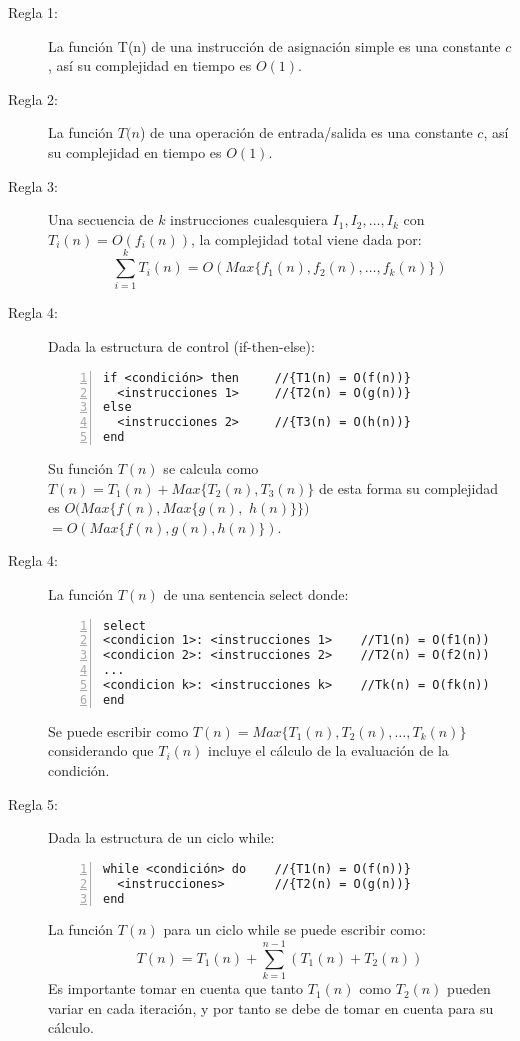 \begin{description}
\item[Regla 1:] La función T(n) de una instrucción de asignación simple es una constante $c$, así su complejidad en tiempo es $O(1)$.

\item[Regla 2:] La función $T(n$) de una operación de entrada/salida es una constante $c$, así su complejidad en tiempo es $O(1)$.

\item[Regla 3:] Una secuencia de $k$ instrucciones cualesquiera $I_1, I_2, \dots , I_k$ con $T_i(n) = O(f_i(n))$, la complejidad total viene dada por:
$$\sum_{i=1}^{k}{T_i(n)}=O(Max\{f_1(n), f_2(n), \dots, f_k(n)\})$$

\item[Regla 4:] Dada la estructura de control (if-then-else):
\begin{lstlisting}[upquote=true, language=pseudo, numbers=left]
if <condición> then		//{T1(n) = O(f(n))}
  <instrucciones 1>		//{T2(n) = O(g(n))}
else
  <instrucciones 2>		//{T3(n) = O(h(n))}
end
\end{lstlisting}
\noindent Su función $T(n)$ se calcula como $T(n) = T_1(n) + Max\{T_2(n), T_3(n)\}$ de esta forma su complejidad es $O(Max\{f(n), Max\{g(n),$ $h(n)\}\})$ $= O(Max\{f(n), g(n), h(n)\})$.

\item[Regla 4:] La función $T(n)$ de una sentencia select donde:
\begin{lstlisting}[upquote=true, language=pseudo, numbers=left]
select
<condicion 1>: <instrucciones 1>	//T1(n) = O(f1(n))
<condicion 2>: <instrucciones 2>	//T2(n) = O(f2(n))
...
<condicion k>: <instrucciones k>	//Tk(n) = O(fk(n))
end
\end{lstlisting}

Se puede escribir como $T(n) = Max\{T_1(n), T_2(n), \dots, T_k(n)\}$ considerando que $T_i(n)$ incluye el cálculo de la evaluación de la condición.

\item[Regla 5:] Dada la estructura de un ciclo while:
\begin{lstlisting}[upquote=true, language=pseudo, numbers=left]
while <condición> do	//{T1(n) = O(f(n))}
  <instrucciones>		//{T2(n) = O(g(n))}
end
\end{lstlisting}
La función $T(n)$ para un ciclo while se puede escribir como: 
$$T(n) = T_1(n) + \sum_{k=1}^{n-1}{(T_1(n) + T_2(n))}$$
Es importante tomar en cuenta que tanto $T_1(n)$ como $T_2(n)$ pueden variar en cada iteración, y por tanto se debe de tomar en cuenta para su cálculo.


\end{description}
